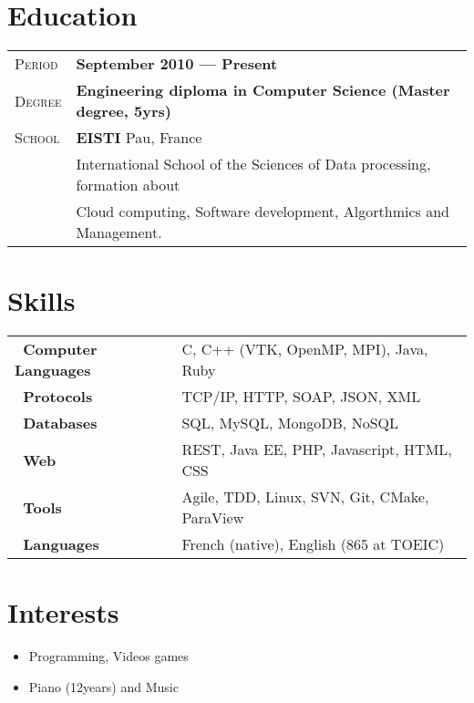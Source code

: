 \documentclass[a4paper, oneside, final]{scrartcl} %
\newcommand{\gray}{\rowcolor[gray]{.90}} %
\begin{document}
\begin{center}
\section{Education}

\begin{tabularx}{1\linewidth}{>{\raggedleft\scshape}p{2cm}X}
  \gray Period & \textbf{September 2010 --- Present}\\
    \gray Degree & \textbf{Engineering diploma in Computer Science (Master degree, 5yrs)}\\
  \gray School & \textbf{EISTI} \hfill Pau, France\\
  & International School of the Sciences of Data processing, formation about\\
  & Cloud computing, Software development, Algorthmics and Management.
\end{tabularx}


\section{Skills}

\begin{tabular}{ @{} >{\bfseries}l @{\hspace{4ex}} l }
  ~Computer Languages & C, C++ (VTK, OpenMP, MPI), Java, Ruby \\
  ~Protocols          & TCP/IP, HTTP, SOAP, JSON, XML\\
  ~Databases          & SQL, MySQL, MongoDB, NoSQL \\
  ~Web                & REST, Java EE, PHP, Javascript, HTML, CSS \\
  ~Tools              & Agile, TDD, Linux, SVN, Git, CMake, ParaView\\
  ~Languages          & French (native), English (865 at TOEIC)
\end{tabular}




\section{Interests}

\begin{itemize}[noitemsep,topsep=0pt,parsep=0pt,partopsep=0pt]
 \setlength{\itemsep}{1pt}
 \item Programming, Videos games
 \item Piano (12years) and Music
\end{itemize}


\end{center}
\end{document}
